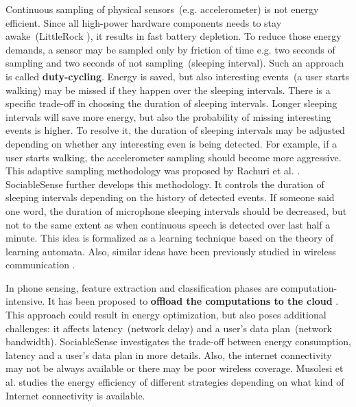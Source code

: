 Continuous sampling of physical sensors\ (e.g. accelerometer) is not energy efficient. Since all high-power hardware components needs to stay awake\ (LittleRock \cite{priyantha:littlerock}), it results in fast battery depletion. To reduce those energy demands, a sensor may be sampled only by friction of time e.g. two seconds of sampling and two seconds of not sampling\ (sleeping interval). Such an approach is called \textbf{duty-cycling}. Energy is saved, but also interesting events\ (a user starts walking) may be missed if they happen over the sleeping intervals. There is a specific trade-off in choosing the duration of sleeping intervals. Longer sleeping intervals will save more energy, but also the probability of missing interesting events is higher. To resolve it, the duration of sleeping intervals may be adjusted depending on whether any interesting even is being detected. For example, if a user starts walking, the accelerometer sampling should become more aggressive. This adaptive sampling methodology was proposed by Rachuri et al. \cite{rachuri:dynamicsensing}. SociableSense \cite{rachuri:socialsense} further develops this methodology.  It controls the duration of sleeping intervals depending on the history of detected events. If someone said one word, the duration of microphone sleeping intervals should be decreased, but not to the same extent as when continuous speech is detected over last half a minute. This idea is formalized as a learning technique based on the theory of learning automata. Also, similar ideas have been previously studied in wireless communication \cite{deshpande:channeling} \cite{deshpande:refocusing} \cite{deshpande:coordinated}.

In phone sensing, feature extraction and classification phases are computation-intensive. It has been proposed to \textbf{offload the computations to the cloud} . This approach could result in energy optimization, but also poses additional challenges: it affects latency\ (network delay) and  a user's data plan\ (network bandwidth). SociableSense \cite{rachuri:socialsense} investigates the trade-off between energy consumption, latency and a user's data plan in more details. Also, the internet connectivity may not be always available or there may be poor wireless coverage. Musolesi et al. \cite{musolesi:offloading} studies the energy efficiency of different strategies depending on what kind of Internet connectivity is available. 

